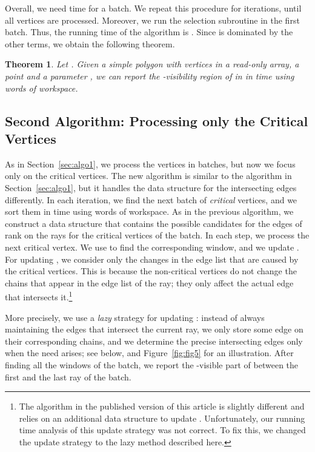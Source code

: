 \documentclass[11pt, a4paper]{article}
\newtheorem{thm}[theorem1]{Theorem}{\bfseries}{\itshape}
\begin{document}
Overall, we need  time for a batch. 
We repeat this procedure for  iterations, until all 
vertices are processed. 
Moreover, we run the selection subroutine in the first batch. 
Thus, the running time of the algorithm is 
. Since  
is dominated by the other terms, we obtain the following theorem.

\begin{thm}\label{thm:limited-workspace}
Let .
Given a simple polygon  with  vertices in a read-only array, 
a point  and a parameter , we
can report the -visibility region of  in  in 
 time using  words of workspace.
\end{thm}
\subsection{Second Algorithm: Processing only the Critical Vertices}
\label{algo2}

As in Section~\ref{sec:algo1}, we process the vertices in 
batches, but now we focus only on the critical vertices.
The new algorithm is similar to the algorithm in
Section~\ref{sec:algo1}, but it handles 
the data structure for the intersecting edges differently. In each 
iteration, we find the next batch of  \emph{critical} vertices,
and we sort them in  time using  words of 
workspace. As in the previous algorithm, we construct a data structure 
 that contains the possible candidates for the edges of rank 
 on the rays for the  critical vertices of the batch. 
In each step, we process the next critical vertex. We use  
to find the corresponding window, and we update .
For updating , we consider only the changes in the edge list
that are caused by the critical vertices. This is because
the non-critical vertices do not change the chains that appear in the 
edge list of the ray; they only affect the actual edge that intersects
it.\footnote{The algorithm in the published version of this
article is slightly different and relies on an
additional data structure  to update .
Unfortunately, our running time analysis of this update strategy
was not correct. To fix this, we changed the update strategy
to the lazy method described here.}

More precisely, we use a \emph{lazy} strategy for updating :
instead of always maintaining the edges that intersect the current ray, we
only store some edge on their corresponding chains, and we determine
the precise intersecting edges only when the need arises; see below, 
and Figure~\ref{fig:fig5} for an illustration.
After finding all the windows of the batch, we report 
the -visible part of  between the first and the last 
ray of the batch.
\end{document}
